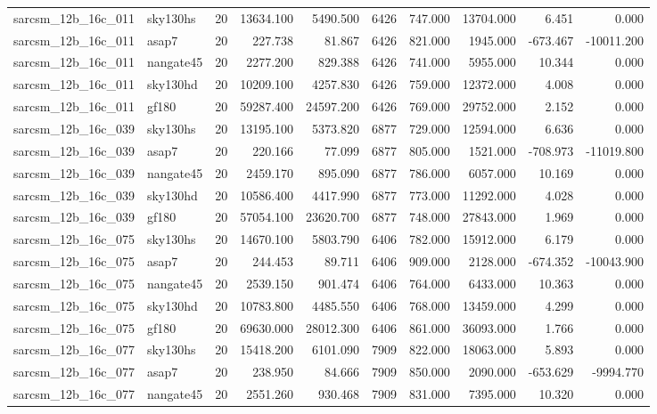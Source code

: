 \documentclass{article}
\begin{document}
\begin{longtable}{llrrrrrrrr}
sarcsm\_12b\_16c\_011 & sky130hs & 20 & 13634.100 & 5490.500 & 6426 & 747.000 & 13704.000 & 6.451 & 0.000 \\
sarcsm\_12b\_16c\_011 & asap7 & 20 & 227.738 & 81.867 & 6426 & 821.000 & 1945.000 & -673.467 & -10011.200 \\
sarcsm\_12b\_16c\_011 & nangate45 & 20 & 2277.200 & 829.388 & 6426 & 741.000 & 5955.000 & 10.344 & 0.000 \\
sarcsm\_12b\_16c\_011 & sky130hd & 20 & 10209.100 & 4257.830 & 6426 & 759.000 & 12372.000 & 4.008 & 0.000 \\
sarcsm\_12b\_16c\_011 & gf180 & 20 & 59287.400 & 24597.200 & 6426 & 769.000 & 29752.000 & 2.152 & 0.000 \\
sarcsm\_12b\_16c\_039 & sky130hs & 20 & 13195.100 & 5373.820 & 6877 & 729.000 & 12594.000 & 6.636 & 0.000 \\
sarcsm\_12b\_16c\_039 & asap7 & 20 & 220.166 & 77.099 & 6877 & 805.000 & 1521.000 & -708.973 & -11019.800 \\
sarcsm\_12b\_16c\_039 & nangate45 & 20 & 2459.170 & 895.090 & 6877 & 786.000 & 6057.000 & 10.169 & 0.000 \\
sarcsm\_12b\_16c\_039 & sky130hd & 20 & 10586.400 & 4417.990 & 6877 & 773.000 & 11292.000 & 4.028 & 0.000 \\
sarcsm\_12b\_16c\_039 & gf180 & 20 & 57054.100 & 23620.700 & 6877 & 748.000 & 27843.000 & 1.969 & 0.000 \\
sarcsm\_12b\_16c\_075 & sky130hs & 20 & 14670.100 & 5803.790 & 6406 & 782.000 & 15912.000 & 6.179 & 0.000 \\
sarcsm\_12b\_16c\_075 & asap7 & 20 & 244.453 & 89.711 & 6406 & 909.000 & 2128.000 & -674.352 & -10043.900 \\
sarcsm\_12b\_16c\_075 & nangate45 & 20 & 2539.150 & 901.474 & 6406 & 764.000 & 6433.000 & 10.363 & 0.000 \\
sarcsm\_12b\_16c\_075 & sky130hd & 20 & 10783.800 & 4485.550 & 6406 & 768.000 & 13459.000 & 4.299 & 0.000 \\
sarcsm\_12b\_16c\_075 & gf180 & 20 & 69630.000 & 28012.300 & 6406 & 861.000 & 36093.000 & 1.766 & 0.000 \\
sarcsm\_12b\_16c\_077 & sky130hs & 20 & 15418.200 & 6101.090 & 7909 & 822.000 & 18063.000 & 5.893 & 0.000 \\
sarcsm\_12b\_16c\_077 & asap7 & 20 & 238.950 & 84.666 & 7909 & 850.000 & 2090.000 & -653.629 & -9994.770 \\
sarcsm\_12b\_16c\_077 & nangate45 & 20 & 2551.260 & 930.468 & 7909 & 831.000 & 7395.000 & 10.320 & 0.000 \\

\end{longtable}
\end{document}
